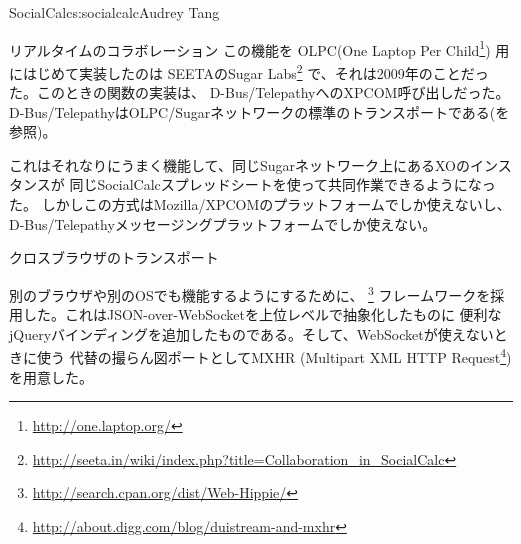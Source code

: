 \begin{aosachapter}{SocialCalc}{s:socialcalc}{Audrey Tang}
\begin{aosasect1}{リアルタイムのコラボレーション}
この機能を
OLPC(One Laptop Per Child\footnote{\url{http://one.laptop.org/}})
用にはじめて実装したのは
SEETAのSugar Labs\footnote{\url{http://seeta.in/wiki/index.php?title=Collaboration_in_SocialCalc}}
で、それは2009年のことだった。このときの関数の実装は、
D-Bus/TelepathyへのXPCOM呼び出しだった。
D-Bus/TelepathyはOLPC/Sugarネットワークの標準のトランスポートである(を参照)。


これはそれなりにうまく機能して、同じSugarネットワーク上にあるXOのインスタンスが
同じSocialCalcスプレッドシートを使って共同作業できるようになった。
しかしこの方式はMozilla/XPCOMのプラットフォームでしか使えないし、
D-Bus/Telepathyメッセージングプラットフォームでしか使えない。

\begin{aosasect2}{クロスブラウザのトランスポート}

別のブラウザや別のOSでも機能するようにするために、
\footnote{\url{http://search.cpan.org/dist/Web-Hippie/}}
フレームワークを採用した。これはJSON-over-WebSocketを上位レベルで抽象化したものに
便利なjQueryバインディングを追加したものである。そして、WebSocketが使えないときに使う
代替の撮らん図ポートとしてMXHR
(Multipart XML HTTP Request\footnote{\url{http://about.digg.com/blog/duistream-and-mxhr}})
を用意した。


\end{aosasect2}
\end{aosasect1}
\end{aosachapter}
